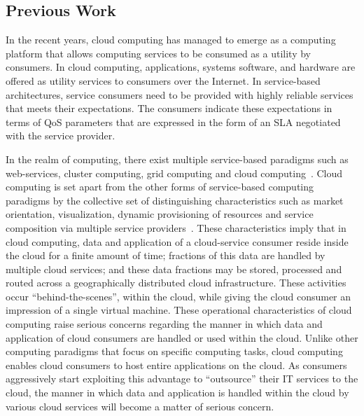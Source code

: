 \documentclass[times, 10pt,twocolumn]{article}
\begin{document}
\subsection{Previous Work}
In the recent years, cloud computing has  managed to emerge as a computing platform that allows computing services to be consumed as a utility by consumers. In cloud computing, applications, systems software, and hardware are offered as utility services to consumers over the Internet. In service-based architectures, service consumers need to be provided with  highly reliable services that meets their expectations. The consumers indicate these expectations in terms of QoS parameters that are expressed in the form of an SLA negotiated with the service provider. 

In the realm of computing, there exist multiple service-based paradigms such as web-services, cluster computing, grid computing and cloud computing~\cite{Bu:09}. Cloud computing is set apart from the other forms of service-based computing paradigms by  the collective set of distinguishing characteristics such as market orientation, visualization, dynamic provisioning of resources and service composition via multiple service providers~\cite{BuYeVeBrBr:09}. These characteristics imply that in cloud computing, data and application of a cloud-service consumer reside inside the cloud for a finite amount of time; fractions of this data are handled by multiple cloud services; and these data fractions may be stored, processed and routed across a geographically distributed cloud infrastructure. These activities occur ``behind-the-scenes'', within the cloud, while giving the cloud consumer an impression of a single virtual machine. These operational characteristics of cloud computing raise serious  concerns regarding the manner in which data and application of cloud consumers are handled or used within the cloud. Unlike other computing paradigms that focus on specific computing tasks, cloud computing enables cloud consumers to host entire applications on the cloud. As consumers aggressively start exploiting this advantage to ``outsource'' their IT services to the cloud, the manner in which data and application is handled within the cloud by various cloud services will become a matter of serious concern.  
\end{document}
